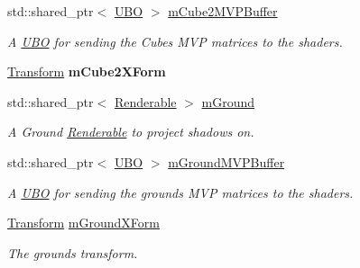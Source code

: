 \begin{DoxyCompactItemize}
\mbox{\label{class_vk_app_a6db469d61314b679beabb604824932ef}} 
std\+::shared\+\_\+ptr$<$ \mbox{\hyperlink{struct_u_b_o}{U\+BO}} $>$ \mbox{\hyperlink{class_vk_app_a6db469d61314b679beabb604824932ef}{m\+Cube2\+M\+V\+P\+Buffer}}
\begin{DoxyCompactList}\small\item\em A \mbox{\hyperlink{struct_u_b_o}{U\+BO}} for sending the Cube\textquotesingle{}s M\+VP matrices to the shaders. \end{DoxyCompactList}\item 
\mbox{\label{class_vk_app_aa1c83bb47937d6b3db19b135d0781c57}} 
\mbox{\hyperlink{class_transform}{Transform}} {\bfseries m\+Cube2\+X\+Form}
\item 
\mbox{\label{class_vk_app_a1cac161b8b3a1ac8b7a373917725e193}} 
std\+::shared\+\_\+ptr$<$ \mbox{\hyperlink{class_renderable}{Renderable}} $>$ \mbox{\hyperlink{class_vk_app_a1cac161b8b3a1ac8b7a373917725e193}{m\+Ground}}
\begin{DoxyCompactList}\small\item\em A Ground \mbox{\hyperlink{class_renderable}{Renderable}} to project shadows on. \end{DoxyCompactList}\item 
\mbox{\label{class_vk_app_ab21c11018f6008ee9f5ca96f17ad4423}} 
std\+::shared\+\_\+ptr$<$ \mbox{\hyperlink{struct_u_b_o}{U\+BO}} $>$ \mbox{\hyperlink{class_vk_app_ab21c11018f6008ee9f5ca96f17ad4423}{m\+Ground\+M\+V\+P\+Buffer}}
\begin{DoxyCompactList}\small\item\em A \mbox{\hyperlink{struct_u_b_o}{U\+BO}} for sending the ground\textquotesingle{}s M\+VP matrices to the shaders. \end{DoxyCompactList}\item 
\mbox{\label{class_vk_app_a8d10ba1a77678a02cfcee820e176a0f8}} 
\mbox{\hyperlink{class_transform}{Transform}} \mbox{\hyperlink{class_vk_app_a8d10ba1a77678a02cfcee820e176a0f8}{m\+Ground\+X\+Form}}
\begin{DoxyCompactList}\small\item\em The ground\textquotesingle{}s transform. \end{DoxyCompactList}\item 

\end{DoxyCompactItemize}
